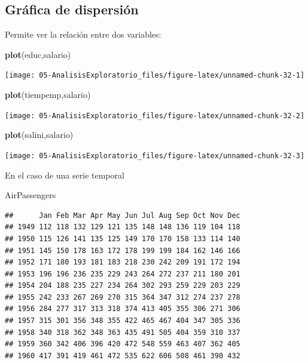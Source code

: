 \documentclass[]{book}
\newenvironment{Shaded}{\begin{snugshade}}{\end{snugshade}}
\newcommand{\KeywordTok}[1]{\textcolor[rgb]{0.13,0.29,0.53}{\textbf{#1}}}
\newcommand{\NormalTok}[1]{#1}
\begin{document}
\subsection{Gráfica de dispersión}\label{grafica-de-dispersion}

Permite ver la relación entre dos variables:

\begin{Shaded}
\begin{Highlighting}[]
\KeywordTok{plot}\NormalTok{(educ,salario)}
\end{Highlighting}
\end{Shaded}

\begin{center}\texttt{[image: 05-AnalisisExploratorio\_files/figure-latex/unnamed-chunk-32-1]} \end{center}

\begin{Shaded}
\begin{Highlighting}[]
\KeywordTok{plot}\NormalTok{(tiempemp,salario)}
\end{Highlighting}
\end{Shaded}

\begin{center}\texttt{[image: 05-AnalisisExploratorio\_files/figure-latex/unnamed-chunk-32-2]} \end{center}

\begin{Shaded}
\begin{Highlighting}[]
\KeywordTok{plot}\NormalTok{(salini,salario)}
\end{Highlighting}
\end{Shaded}

\begin{center}\texttt{[image: 05-AnalisisExploratorio\_files/figure-latex/unnamed-chunk-32-3]} \end{center}

En el caso de una serie temporal

\begin{Shaded}
\begin{Highlighting}[]
\NormalTok{AirPassengers}
\end{Highlighting}
\end{Shaded}

\begin{verbatim}
##      Jan Feb Mar Apr May Jun Jul Aug Sep Oct Nov Dec
## 1949 112 118 132 129 121 135 148 148 136 119 104 118
## 1950 115 126 141 135 125 149 170 170 158 133 114 140
## 1951 145 150 178 163 172 178 199 199 184 162 146 166
## 1952 171 180 193 181 183 218 230 242 209 191 172 194
## 1953 196 196 236 235 229 243 264 272 237 211 180 201
## 1954 204 188 235 227 234 264 302 293 259 229 203 229
## 1955 242 233 267 269 270 315 364 347 312 274 237 278
## 1956 284 277 317 313 318 374 413 405 355 306 271 306
## 1957 315 301 356 348 355 422 465 467 404 347 305 336
## 1958 340 318 362 348 363 435 491 505 404 359 310 337
## 1959 360 342 406 396 420 472 548 559 463 407 362 405
## 1960 417 391 419 461 472 535 622 606 508 461 390 432
\end{verbatim}
\end{document}
